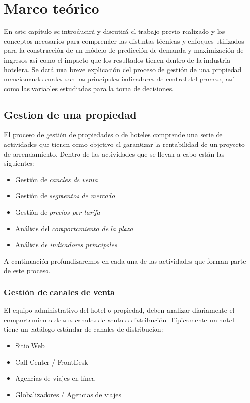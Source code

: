 \chapter{Marco teórico}
\label{ch:marco teorico}

En este capítulo se introducirá y discutirá el trabajo previo realizado y los conceptos necesarios para comprender las distintas técnicas y enfoques utilizados para la construcción de un módelo de predicción de demanda y maximización de ingresos así como el impacto que los resultados tienen dentro de la industria hotelera. Se dará una breve explicación del proceso de gestión de una propiedad mencionando cuales son los principales indicadores de control del proceso, así como las variables estudiadas para la toma de decisiones.

\section*{Gestion de una propiedad}

El proceso de gestión de propiedades o de hoteles comprende una serie de actividades que tienen como objetivo el garantizar la rentabilidad de un proyecto de arrendamiento. Dentro de las actividades que se llevan a cabo están las siguientes:
\begin{itemize}
  \item Gestión de \emph{canales de venta}
  \item Gestión de \emph{segmentos de mercado}
  \item Gestión de \emph{precios por tarifa}
  \item Análisis del \emph{comportamiento de la plaza}
  \item Análisis de \emph{indicadores principales}
\end{itemize}

A continuación profundizaremos en cada una de las actividades que forman parte de este proceso.

\subsection*{Gestión de canales de venta}

El equipo administrativo del hotel o propiedad, deben analizar diariamente el comportamiento de sus canales de venta o distribución. Típicamente un hotel tiene un catálogo estándar de canales de distribución:
\begin{itemize}
  \item Sitio Web 
  \item Call Center / FrontDesk
  \item Agencias de viajes en línea
  \item Globalizadores / Agencias de viajes
\end{itemize}

